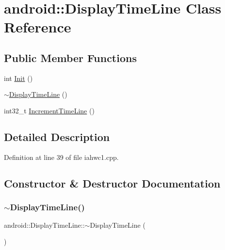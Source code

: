 \hypertarget{classandroid_1_1DisplayTimeLine}{}\section{android\+:\+:Display\+Time\+Line Class Reference}
\label{classandroid_1_1DisplayTimeLine}
\subsection*{Public Member Functions}
\begin{DoxyCompactItemize}
\item 
int \mbox{\hyperlink{classandroid_1_1DisplayTimeLine_a71a4ce575620d5535dd336add3e1acdc}{Init}} ()
\item 
\mbox{\hyperlink{classandroid_1_1DisplayTimeLine_aee213d6965ebb6dd13f9c3765ba43aae}{$\sim$\+Display\+Time\+Line}} ()
\item 
int32\+\_\+t \mbox{\hyperlink{classandroid_1_1DisplayTimeLine_a536fff91c0116195b9ee7d1e58538d52}{Increment\+Time\+Line}} ()
\end{DoxyCompactItemize}


\subsection{Detailed Description}


Definition at line 39 of file iahwc1.\+cpp.



\subsection{Constructor \& Destructor Documentation}
\mbox{\label{classandroid_1_1DisplayTimeLine_aee213d6965ebb6dd13f9c3765ba43aae}} 
\subsubsection{\texorpdfstring{$\sim$\+Display\+Time\+Line()}{~DisplayTimeLine()}}
{\footnotesize\ttfamily android\+::\+Display\+Time\+Line\+::$\sim$\+Display\+Time\+Line (\begin{DoxyParamCaption}{ }\end{DoxyParamCaption})\hspace{0.3cm}{\ttfamily [inline]}}



